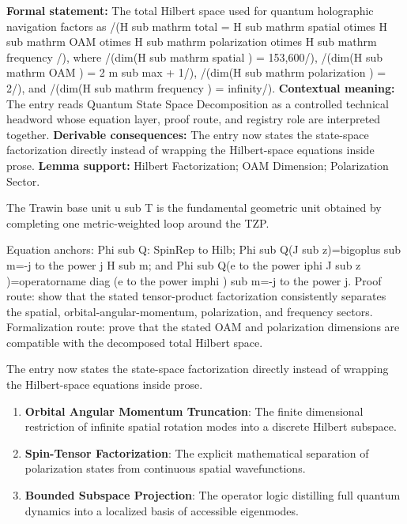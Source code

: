 \begingroup\footnotesize\setlength{\emergencystretch}{3em}\sloppy
\textbf{Formal statement:} The total Hilbert space used for quantum holographic navigation factors as /(H sub mathrm total = H sub mathrm spatial otimes H sub mathrm OAM otimes H sub mathrm polarization otimes H sub mathrm frequency /), where /(dim(H sub mathrm spatial ) = 153,600/), /(dim(H sub mathrm OAM ) = 2 m sub max + 1/), /(dim(H sub mathrm polarization ) = 2/), and /(dim(H sub mathrm frequency ) = infinity/). \textbf{Contextual meaning:} The entry reads Quantum State Space Decomposition as a controlled technical headword whose equation layer, proof route, and registry role are interpreted together. \textbf{Derivable consequences:} The entry now states the state-space factorization directly instead of wrapping the Hilbert-space equations inside prose. \textbf{Lemma support:} Hilbert Factorization; OAM Dimension; Polarization Sector.\par
\endgroup

The Trawin base unit u sub T is the fundamental geometric unit obtained by completing one metric-weighted loop around the TZP.

Equation anchors: Phi sub Q: SpinRep to Hilb; Phi sub Q(J sub z)=bigoplus sub m=-j to the power j H sub m; and Phi sub Q(e to the power iphi J sub z )=operatorname diag (e to the power imphi ) sub m=-j to the power j. Proof route: show that the stated tensor-product factorization consistently separates the spatial, orbital-angular-momentum, polarization, and frequency sectors. Formalization route: prove that the stated OAM and polarization dimensions are compatible with the decomposed total Hilbert space.

The entry now states the state-space factorization directly instead of wrapping the Hilbert-space equations inside prose.
\endgroup

\begin{enumerate}[leftmargin=1.6em,itemsep=6pt,topsep=4pt]
\item \textbf{Orbital Angular Momentum Truncation}: The finite dimensional restriction of infinite spatial rotation modes into a discrete Hilbert subspace.
\item \textbf{Spin-Tensor Factorization}: The explicit mathematical separation of polarization states from continuous spatial wavefunctions.
\item \textbf{Bounded Subspace Projection}: The operator logic distilling full quantum dynamics into a localized basis of accessible eigenmodes.
\end{enumerate}

